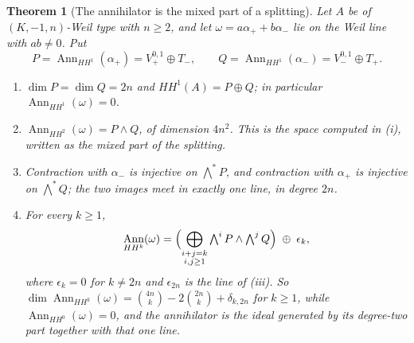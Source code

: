 \documentclass[11pt,reqno]{amsart}
\theoremstyle{plain}
\newtheorem{theorem}{Theorem}[section]
\theoremstyle{definition}
\theoremstyle{remark}
\DeclareMathOperator{\Ann}{Ann}
\begin{document}
\begin{theorem}[The annihilator is the mixed part of a splitting]
\label{thm:hhsplitting}
Let $A$ be of $(K,-1,n)$-Weil type with $n\ge2$, and let
$\omega=a\alpha_{+}+b\alpha_{-}$ lie on the Weil line with $ab\ne0$. Put
\[
  P=\Ann_{HH^{1}}(\alpha_{+})=V_{+}^{0,1}\oplus T_{-},
  \qquad
  Q=\Ann_{HH^{1}}(\alpha_{-})=V_{-}^{0,1}\oplus T_{+} .
\]
\begin{enumerate}[label=\textup{(\roman*)},leftmargin=2.6em,itemsep=2pt]
\item $\dim P=\dim Q=2n$ and $HH^{1}(A)=P\oplus Q$; in particular
  $\Ann_{HH^{1}}(\omega)=0$.
\item $\Ann_{HH^{2}}(\omega)=P\wedge Q$, of dimension $4n^{2}$. This is the
  space computed in (i), written as the mixed part of the
  splitting.
\item Contraction with $\alpha_{-}$ is injective on $\bigwedge^{*}P$, and
  contraction with $\alpha_{+}$ is injective on $\bigwedge^{*}Q$; the two
  images meet in exactly one line, in degree $2n$.
\item For every $k\ge1$,
  \[
    \Ann_{HH^{k}}(\omega)
    =\Bigl(\bigoplus_{\substack{i+j=k\\ i,j\ge1}}
      \textstyle\bigwedge^{i}P\wedge\bigwedge^{j}Q\Bigr)\;\oplus\;\epsilon_{k},
  \]
  where $\epsilon_{k}=0$ for $k\ne2n$ and $\epsilon_{2n}$ is the line of
  \textup{(iii)}. So
  $\dim\Ann_{HH^{k}}(\omega)=\binom{4n}{k}-2\binom{2n}{k}+\delta_{k,2n}$ for
  $k\ge1$, while $\Ann_{HH^{0}}(\omega)=0$, and the annihilator is the ideal
  generated by its degree-two part together with that one line.
\end{enumerate}
\end{theorem}
\end{document}
